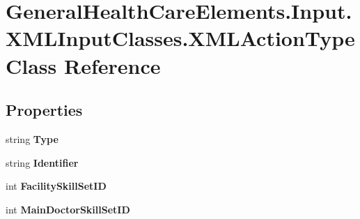 \hypertarget{class_general_health_care_elements_1_1_input_1_1_x_m_l_input_classes_1_1_x_m_l_action_type}{}\section{General\+Health\+Care\+Elements.\+Input.\+X\+M\+L\+Input\+Classes.\+X\+M\+L\+Action\+Type Class Reference}
\label{class_general_health_care_elements_1_1_input_1_1_x_m_l_input_classes_1_1_x_m_l_action_type}
\subsection*{Properties}
\begin{DoxyCompactItemize}
\item 
string {\bfseries Type}\hypertarget{class_general_health_care_elements_1_1_input_1_1_x_m_l_input_classes_1_1_x_m_l_action_type_a1d18eba7462ebce212d7f20e5f31f2ab}{}\label{class_general_health_care_elements_1_1_input_1_1_x_m_l_input_classes_1_1_x_m_l_action_type_a1d18eba7462ebce212d7f20e5f31f2ab}

\item 
string {\bfseries Identifier}\hypertarget{class_general_health_care_elements_1_1_input_1_1_x_m_l_input_classes_1_1_x_m_l_action_type_a6a68a31c8dac92b7eb85566b1cb6f33e}{}\label{class_general_health_care_elements_1_1_input_1_1_x_m_l_input_classes_1_1_x_m_l_action_type_a6a68a31c8dac92b7eb85566b1cb6f33e}

\item 
int {\bfseries Facility\+Skill\+Set\+ID}\hypertarget{class_general_health_care_elements_1_1_input_1_1_x_m_l_input_classes_1_1_x_m_l_action_type_a6c9af6d452fb0fcd84b859eeae826a59}{}\label{class_general_health_care_elements_1_1_input_1_1_x_m_l_input_classes_1_1_x_m_l_action_type_a6c9af6d452fb0fcd84b859eeae826a59}

\item 
int {\bfseries Main\+Doctor\+Skill\+Set\+ID}\hypertarget{class_general_health_care_elements_1_1_input_1_1_x_m_l_input_classes_1_1_x_m_l_action_type_a864baa4b130c78d22772623b5d6b3840}{}\label{class_general_health_care_elements_1_1_input_1_1_x_m_l_input_classes_1_1_x_m_l_action_type_a864baa4b130c78d22772623b5d6b3840}


\end{DoxyCompactItemize}
